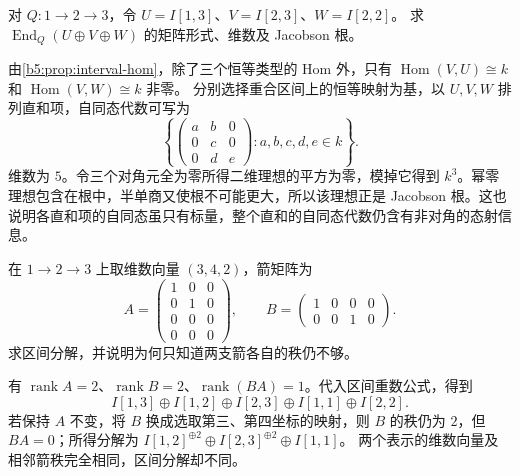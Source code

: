 \begin{exercise}\label{b5:ex:09-interval-endomorphism-algebra}
	对 \(Q:1\to2\to3\)，令 \(U=I[1,3]\)、\(V=I[2,3]\)、\(W=I[2,2]\)。 求 \(\operatorname{End}_Q(U\oplus V\oplus W)\) 的矩阵形式、维数及 Jacobson 根。
\end{exercise}
\begin{solution}
	由\cref{b5:prop:interval-hom}，除了三个恒等类型的 Hom 外，只有 \(\operatorname{Hom}(V,U)\cong k\) 和 \(\operatorname{Hom}(V,W)\cong k\) 非零。 分别选择重合区间上的恒等映射为基，以 \(U,V,W\) 排列直和项，自同态代数可写为
	\[
		\left\{
		\begin{pmatrix}
			a&b&0\\0&c&0\\0&d&e
		\end{pmatrix}:a,b,c,d,e\in k
		\right\}.
	\]
	维数为 \(5\)。令三个对角元全为零所得二维理想的平方为零，模掉它得到 \(k^3\)。幂零理想包含在根中，半单商又使根不可能更大，所以该理想正是 Jacobson 根。这也说明各直和项的自同态虽只有标量，整个直和的自同态代数仍含有非对角的态射信息。
\end{solution}

\begin{exercise}\label{b5:ex:09-a3-matrix-decomposition}
	在 \(1\to2\to3\) 上取维数向量 \((3,4,2)\)，箭矩阵为
	\[
		A=\begin{pmatrix}1&0&0\\0&1&0\\0&0&0\\0&0&0\end{pmatrix},
		\qquad
		B=\begin{pmatrix}1&0&0&0\\0&0&1&0\end{pmatrix}.
	\]
	求区间分解，并说明为何只知道两支箭各自的秩仍不够。
\end{exercise}
\begin{solution}
	有 \(\operatorname{rank}A=2\)、\(\operatorname{rank}B=2\)、\(\operatorname{rank}(BA)=1\)。代入区间重数公式，得到
	\[
		I[1,3]\oplus I[1,2]\oplus I[2,3]\oplus I[1,1]\oplus I[2,2].
	\]
	若保持 \(A\) 不变，将 \(B\) 换成选取第三、第四坐标的映射，则 \(B\) 的秩仍为 \(2\)，但 \(BA=0\)；所得分解为 \(I[1,2]^{\oplus2}\oplus I[2,3]^{\oplus2}\oplus I[1,1]\)。 两个表示的维数向量及相邻箭秩完全相同，区间分解却不同。
\end{solution}

